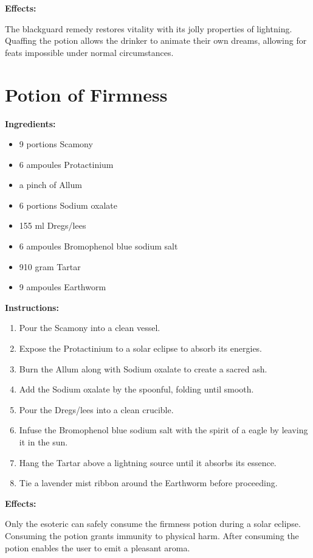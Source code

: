 \documentclass{article}
\begin{document}
\textbf{Effects:}

The blackguard remedy restores vitality with its jolly properties of lightning. Quaffing the potion allows the drinker to animate their own dreams, allowing for feats impossible under normal circumstances.

\newpage
\section*{Potion of Firmness}

\textbf{Ingredients:}

\begin{itemize}
  \item 9 portions Scamony
  \item 6 ampoules Protactinium
  \item a pinch of Allum
  \item 6 portions Sodium oxalate
  \item 155 ml Dregs/lees
  \item 6 ampoules Bromophenol blue sodium salt
  \item 910 gram Tartar
  \item 9 ampoules Earthworm
\end{itemize}

\textbf{Instructions:}

\begin{enumerate}
  \item Pour the Scamony into a clean vessel.
  \item Expose the Protactinium to a solar eclipse to absorb its energies.
  \item Burn the Allum along with Sodium oxalate to create a sacred ash.
  \item Add the Sodium oxalate by the spoonful, folding until smooth.
  \item Pour the Dregs/lees into a clean crucible.
  \item Infuse the Bromophenol blue sodium salt with the spirit of a eagle by leaving it in the sun.
  \item Hang the Tartar above a lightning source until it absorbs its essence.
  \item Tie a lavender mist ribbon around the Earthworm before proceeding.
\end{enumerate}

\textbf{Effects:}

Only the esoteric can safely consume the firmness potion during a solar eclipse. Consuming the potion grants immunity to physical harm. After consuming the potion enables the user to emit a pleasant aroma.
\end{document}
